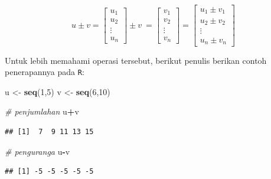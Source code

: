 \documentclass[
]{book}
\newenvironment{Shaded}{\begin{snugshade}}{\end{snugshade}}
\newcommand{\CommentTok}[1]{\textcolor[rgb]{0.56,0.35,0.01}{\textit{#1}}}
\newcommand{\DecValTok}[1]{\textcolor[rgb]{0.00,0.00,0.81}{#1}}
\newcommand{\FunctionTok}[1]{\textcolor[rgb]{0.13,0.29,0.53}{\textbf{#1}}}
\newcommand{\NormalTok}[1]{#1}
\newcommand{\OtherTok}[1]{\textcolor[rgb]{0.56,0.35,0.01}{#1}}
\newcommand{\SpecialCharTok}[1]{\textcolor[rgb]{0.81,0.36,0.00}{\textbf{#1}}}
\theoremstyle{definition}
\theoremstyle{definition}
\theoremstyle{definition}
\theoremstyle{definition}
\theoremstyle{remark}
\begin{document}
\begin{equation}
u \pm v = \begin{bmatrix}
      u_1            \\[0.3em]
      u_2            \\[0.3em]
      \vdots         \\[0.3em] 
      u_n
     \end{bmatrix}
\pm v\ = \begin{bmatrix}
      v_1            \\[0.3em]
      v_2            \\[0.3em]
      \vdots         \\[0.3em] 
      v_n
     \end{bmatrix}
= \begin{bmatrix}
      u_1 \pm v_1            \\[0.3em]
      u_2 \pm v_2           \\[0.3em]
      \vdots         \\[0.3em] 
      u_n \pm v_n
     \end{bmatrix}
     \label{eq:addvector2}
\end{equation}

Untuk lebih memahami operasi tersebut, berikut penulis berikan contoh penerapannya pada \texttt{R}:

\begin{Shaded}
\begin{Highlighting}[]
\NormalTok{u }\OtherTok{\textless{}{-}} \FunctionTok{seq}\NormalTok{(}\DecValTok{1}\NormalTok{,}\DecValTok{5}\NormalTok{)}
\NormalTok{v }\OtherTok{\textless{}{-}} \FunctionTok{seq}\NormalTok{(}\DecValTok{6}\NormalTok{,}\DecValTok{10}\NormalTok{)}

\CommentTok{\# penjumlahan}
\NormalTok{u}\SpecialCharTok{+}\NormalTok{v}
\end{Highlighting}
\end{Shaded}

\begin{verbatim}
## [1]  7  9 11 13 15
\end{verbatim}

\begin{Shaded}
\begin{Highlighting}[]
\CommentTok{\# penguranga}
\NormalTok{u}\SpecialCharTok{{-}}\NormalTok{v}
\end{Highlighting}
\end{Shaded}

\begin{verbatim}
## [1] -5 -5 -5 -5 -5
\end{verbatim}
\end{document}
